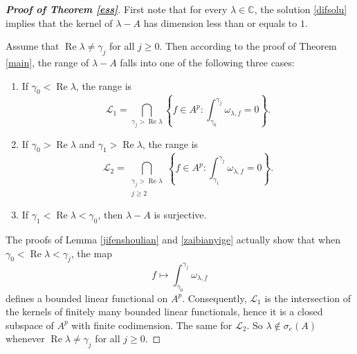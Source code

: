 \documentclass{amsart}
\theoremstyle{proclaim}
\theoremstyle{fancyproclaim}
\theoremstyle{definition}
\theoremstyle{fancystatement}
\numberwithin{equation}{section}
\begin{document}
\begin{proof}[\textbf{Proof of Theorem \ref{ess}}]

First note that for every $\lambda\in\mathbb{C}$, the solution \eqref{difsolu} implies that the kernel of $\lambda-A$ has dimension less than or equals to $1$.

Assume that $\operatorname{Re}\lambda\ne\gamma_j$ for all $j\geq0$. Then according to the proof of Theorem \ref{main}, the range of $\lambda-A$  falls into one of the following three cases:
\begin{enumerate}
\item If $\gamma_0<\operatorname{Re}\lambda$, the range is
$$\mathcal{L}_1=\bigcap_{\gamma_j>\operatorname{Re}\lambda}\left\{f\in A^p : \int_{\gamma_0}^{\gamma_j}\omega_{\lambda,f}=0\right\}.$$ 

\item If $\gamma_0>\operatorname{Re}\lambda$ and $\gamma_1>\operatorname{Re}\lambda$,  the range is
$$\mathcal{L}_2=\bigcap_{\substack{\gamma_j>\operatorname{Re}\lambda\\ j\geq 2}}\left\{f\in A^p : \int_{\gamma_1}^{\gamma_j}\omega_{\lambda,f}=0\right\}.$$ 

\item If  $\gamma_1<\operatorname{Re}\lambda<\gamma_0$, then $\lambda-A$ is surjective.
\end{enumerate}
The proofs of Lemma \ref{jifenshoulian} and \ref{zaibianyige} actually show that when $\gamma_0<\operatorname{Re}\lambda<\gamma_j$, the map
$$f\mapsto \int_{\gamma_0}^{\gamma_j}\omega_{\lambda,f}$$
defines a bounded linear functional on $A^p$. Consequently, $\mathcal{L}_1$ is the intersection of the kernels of finitely many bounded linear functionals, hence it is a closed subspace of $A^p$ with finite codimension. The same for $\mathcal{L}_2$. So $\lambda\notin\sigma_e(A)$ whenever $\operatorname{Re}\lambda\ne\gamma_j$ for all $j\geq0$.


\end{proof}
\end{document}
